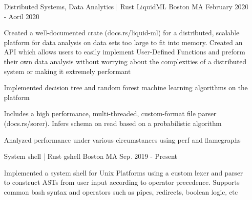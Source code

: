 

\begin{cventries}
    \cventry
    {Distributed Systems, Data Analytics | Rust} %
    {LiquidML} %
    {Boston MA} %
    {February 2020 - Aoril 2020} %
    {
      \begin{cvitems} %
        \item {Created a well-documented crate (docs.rs/liquid-ml) for a distributed,  scalable platform for data analysis on data sets too large to fit into memory. Created an API which allows users to easily implement User-Defined Functions and preform their own data analysis without worrying about the complexities of a distributed system or making it extremely performant}
        \item {Implemented decision tree and random forest machine learning algorithms on the platform}
        \item {Includes a high performance, multi-threaded, custom-format file parser (docs.rs/sorer). Infers schema on read based on a probabilistic algorithm}
        \item {Analyzed performance under various circumstances using perf and flamegraphs}
      \end{cvitems}
    }

    \cventry
    {System shell | Rust} %
    {gshell} %
    {Boston MA} %
    {Sep. 2019 - Present} %
    {
      \begin{cvitems} %
        \item {Implemented a system shell for Unix Platforms using a custom lexer and parser to construct ASTs from user input according to operator precedence. Supports common bash syntax and operators such as pipes, redirects, boolean logic, etc}
      \end{cvitems}
    }

\end{cventries}
